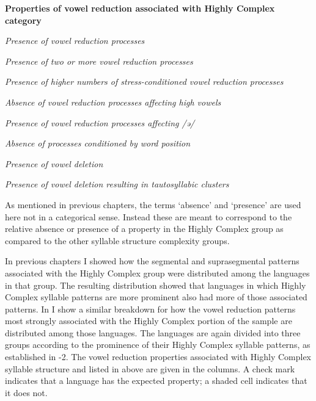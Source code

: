 \ea\label{ex:6.20}
  \textbf{Properties of vowel reduction associated with Highly Complex category}

\textit{Presence of vowel reduction processes}

\textit{Presence of two or more vowel reduction processes}

\textit{Presence of higher numbers of stress-conditioned vowel reduction processes}

\textit{Absence of vowel reduction processes affecting high vowels}

\textit{Presence of vowel reduction processes affecting /ə/}

\textit{Absence of processes conditioned by word position}

\textit{Presence of vowel deletion}

\textit{Presence of vowel deletion resulting in tautosyllabic clusters}
\z

  As mentioned in previous chapters, the terms ‘absence’ and ‘presence’ are used here not in a categorical sense. Instead these are meant to correspond to the relative absence or presence of a property in the Highly Complex group as compared to the other syllable structure complexity groups.

  In previous chapters I showed how the segmental and suprasegmental patterns associated with the Highly Complex group were distributed among the languages in that group. The resulting distribution showed that languages in which Highly Complex syllable patterns are more prominent also had more of those associated patterns. In  I show a similar breakdown for how the vowel reduction patterns most strongly associated with the Highly Complex portion of the sample are distributed among those languages. The languages are again divided into three groups according to the prominence of their Highly Complex syllable patterns, as established in -2. The vowel reduction properties associated with Highly Complex syllable structure and listed in  above are given in the columns. A check mark indicates that a language has the expected property; a shaded cell indicates that it does not. 

